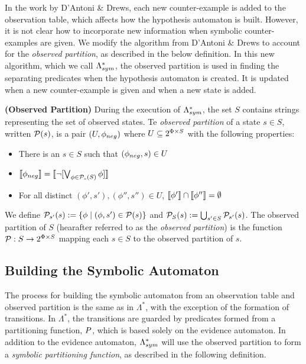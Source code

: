 

In the work by D'Antoni \& Drews, each new counter-example is added to the observation table, which affects how the hypothesis automaton is built. 
However, it is not clear how to incorporate new information when symbolic counter-examples are given. 
We modify the algorithm from D'Antoni \& Drews to account for the \emph{observed partition}, as described in the below definition. 
In this new algorithm, which we call $\Lambda^*_{sym}$, the observed partition is used in finding the separating predicates when the hypothesis automaton is created. 
It is updated when a new counter-example is given and when a new state is added. 


\begin{definition}
\textbf{(Observed Partition) } 
During the execution of $\Lambda^*_{sym}$, the set $S$ contains strings representing the set of observed states. 
Te \emph{observed partition} of a state $s \in S$, written $\mathcal{P}(s)$, is a pair $(U, \phi_{neg})$ where $U \subseteq 2^{\Phi \times S}$ with the following properties: 
\begin{itemize}
\item There is an $s \in S$ such that $(\phi_{neg}, s) \in U$
\item $\llbracket \phi_{neg}  \rrbracket= \llbracket \neg [\bigvee_{\phi \in \mathcal{P}_{s}(S)} \phi ] \rrbracket$
\item For all distinct $(\phi',s'),(\phi'',s'')  \in U$, $\llbracket \phi' \rrbracket \cap \llbracket \phi'' \rrbracket = \emptyset$
\end{itemize}
We define $\mathcal{P}_{s'}(s) := \{ \phi \; | \; (\phi, s') \in \mathcal{P}(s) \}$ and $\mathcal{P}_{S}(s) := \bigcup_{s' \in S} \mathcal{P}_{s'}(s) $. 
The observed partition of $S$ (hearafter referred to as the \emph{observed partition}) is the function $\mathcal{P}: S \rightarrow 2^{\Phi \times S}$ mapping each $s \in S$ to the observed partition of $s$.
\end{definition}


\subsection{Building the Symbolic Automaton}

The process for building the symbolic automaton from an observation table and observed partition is the same as in $\Lambda^*$, with the exception of the formation of transitions.
In $\Lambda^*$, the transitions are guarded by predicates formed from a partitioning function, $P$, which is based solely on the evidence automaton. 
In addition to the evidence automaton, $\Lambda^*_{sym}$ will use the observed partition to form a \emph{symbolic partitioning function},  as described in the following definition.

